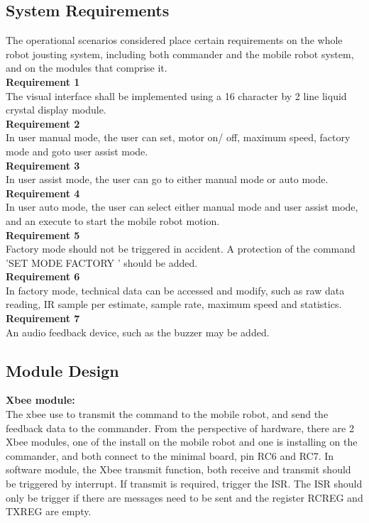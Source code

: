 \documentclass[MTRX3700report.tex]{subfiles}
\begin{document}
\subsection{System Requirements}
The operational scenarios considered place certain requirements on the whole robot jousting system, including both commander and the mobile robot system, and on the modules that comprise it.\\
\textbf{Requirement 1 }\\
The visual interface shall be implemented using a 16 character by 2 line liquid crystal display module.\\
\textbf{Requirement 2 }\\
In user manual mode, the user can set, motor on/ off, maximum speed, factory mode and goto user assist mode.\\
\textbf{Requirement 3 }\\
In user assist mode, the user can go to either manual mode or auto mode.\\
\textbf{Requirement 4 }\\
In user auto mode, the user can select either manual mode and user assist mode, and an execute to start the mobile robot motion.\\
\textbf{Requirement 5 }\\
Factory mode should not be triggered in accident. A protection of the command 'SET MODE FACTORY ' should be added.\\
\textbf{Requirement 6 }\\
In factory mode, technical data can be accessed and modify, such as raw data reading, IR sample per estimate, sample rate, maximum speed and statistics.\\
\textbf{Requirement 7 }\\
An audio feedback device, such as the buzzer may be added.\\

\subsection{Module Design}
\textbf{Xbee module:}\\
The xbee use to transmit the command to the mobile robot, and send the feedback data to the commander. From the perspective of hardware, there are 2 Xbee modules, one of the install on the mobile robot and one is installing on the commander, and both connect to the minimal board, pin RC6 and RC7. In software module, the Xbee transmit function, both receive and transmit should be triggered by interrupt. If transmit is required, trigger the ISR. The ISR should only be trigger if there are messages need to be sent and the register RCREG and TXREG are empty.\\
\end{document}
